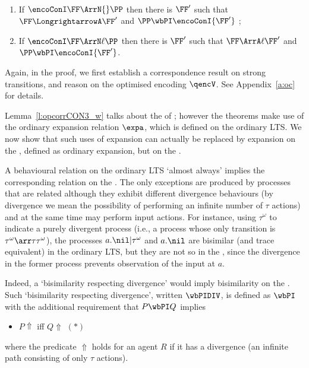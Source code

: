 \begin{lemma} %
\label{l:opcorrCON3_w}
$ $ \begin{enumerate}


\item If 
$ \encoConI \FF \ArrN {} \PP$ then there is $\FF'$ such that 
$\FF \LongrightarrowA \FF'$  and  
$\PP  \wbPI \encoConI {\FF'}$ ; 


\item If
$ \encoConI \FF \ArrN\ell \PP$
 then there is $\FF'$ such that
 $\FF \ArrA\ell \FF'$
and $\PP \wbPI \encoConI {\FF'}$.
\end{enumerate} 
\end{lemma} 

\noindent
Again, in the proof,  we first establish a correspondence result on strong transitions,
and reason on the optimised encoding $\qencV$. 
See Appendix~\ref{a:oc} for details.


Lemma~\ref{l:opcorrCON3_w}  
talks about the \opLTS of \piI;
  however the theorems make use of the
ordinary expansion relation  $\expa $, which is defined on the ordinary LTS. 
We now show that 
such uses of
expansion can actually be replaced by expansion on the \opLTS, defined as ordinary
expansion, but on the \opLTS.

A behavioural relation on the ordinary LTS `almost always' implies the corresponding
relation on the \opLTS.  The only exceptions are produced by processes that are related
although they exhibit different divergence behaviours (by divergence we mean the
possibility of performing an infinite number of $\tau$ actions) and at the same time may
perform input actions. For instance, using $\tau^\omega$ to indicate a purely divergent
process  (i.e., a process whose only transition is $\tau^\omega \arr\tau \tau^\omega$), 
 the processes $a.\nil | \tau^\omega $ and $a.\nil$ are  bisimilar (and trace equivalent)
 in the ordinary LTS, but they are not so in the \opLTS, since the divergence in the former
 process prevents observation of the input at $a$. 


Indeed, a `bisimilarity respecting divergence' would imply bisimilarity on the \opLTS. 
Such  `bisimilarity respecting divergence', written $\wbPIDIV$, is defined as $\wbPI$ with
the additional requirement that $P \wbPI Q$ implies 
\begin{itemize}
\item
$P \Uparrow $ iff  $Q \Uparrow $ \hfill $(*)$
\end{itemize} 
where the predicate $ \Uparrow $ holds for an  agent $R$  if it
has a divergence (an infinite path 
consisting of only $\tau$ actions). 

